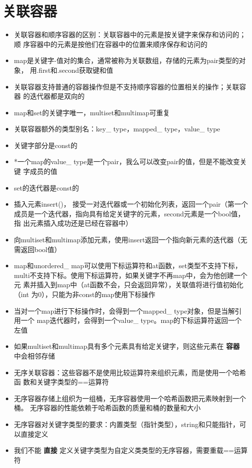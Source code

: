 \documentclass[11pt]{article}
\begin{document}
\section{关联容器}
\label{sec-8}
\begin{itemize}
\item 关联容器和顺序容器的区别：关联容器中的元素是按关键字来保存和访问的；顺
序容器中的元素是按他们在容器中的位置来顺序保存和访问的
\item map是关键字-值对的集合，通常被称为关联数组，存储的元素为pair类型的对象，
用.first和.second获取键和值
\item 关联容器支持普通的容器操作但是不支持顺序容器的位置相关的操作；关联容器
的迭代器都是双向的
\item map和set的关键字唯一，multiset和multimap可重复
\item 关联容器额外的类型别名：key\_ type，mapped\_ type，value\_ type
\item 关键字部分是const的
\item *一个map的value\_ type是一个pair，我么可以改变pair的值，但是不能改变关键
字成员的值
\item set的迭代器是const的
\item 插入元素insert()， 接受一对迭代器或一个初始化列表，返回一个pair（第一个
成员是一个迭代器，指向具有给定关键字的元素，second元素是一个bool值，指
出元素插入成功还是已经在容器中）
\item 向multiset和multimap添加元素，使用insert返回一个指向新元素的迭代器（无
需返回bool值）
\item map和unordered\_ map可以使用下标运算符和at函数，set类型不支持下标，
multi不支持下标。使用下标运算符，如果关键字不再map中，会为他创建一个元
素并插入到map中（at函数不会，只会返回异常），关联值将进行值初始化（int
为0），只能为非const的map使用下标操作
\item 当对一个map进行下标操作时，会得到一个mapped\_ type对象，但是当解引用一个
map迭代器时，会得到一个value\_ type。map的下标运算符返回一个左值
\item 如果multiset和multimap具有多个元素具有给定关键字，则这些元素在 \textbf{容器}
  中会相邻存储
\item 无序关联容器：这些容器不是使用比较运算符来组织元素，而是使用一个哈希函
数和关键字类型的==运算符
\item 无序容器存储上组织为一组桶，无序容器使用一个哈希函数把元素映射到一个桶。
无序容器的性能依赖于哈希函数的质量和桶的数量和大小
\item 无序容器对关键字类型的要求：内置类型（指针类型），string和只能指针，可
以直接定义
\item 我们不能 \textbf{直接} 定义关键字类型为自定义类类型的无序容器，需要重载==运算
符
\end{itemize}
\end{document}
